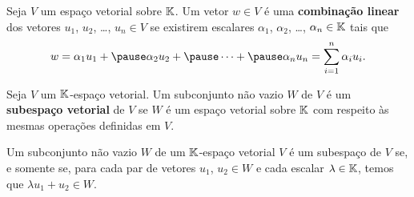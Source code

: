 \documentclass{beamer}
\begin{document}
    \begin{frame}
        \begin{definicao}
	        Seja $V$ um espa\c{c}o vetorial sobre $\mathbb{K}$.\pause 
	        Um vetor $w \in V$ \'e uma \textbf{combina\c{c}\~ao linear} \pause dos vetores $u_1$, \pause $u_2$, \pause \dots, 
	        $u_n \in V$ \pause se existirem escalares $\alpha_1$, \pause $\alpha_2$, \pause \dots, \pause $\alpha_n \in \mathbb{K}$ tais que\pause 
    	    \[
	    	    w = \alpha_1 u_1 + \pause \alpha_2u_2 + \pause \cdots + \pause \alpha_nu_n = \sum_{i = 1}^n \alpha_iu_i.
        	\]
        \end{definicao}
    \end{frame}

    \begin{frame}
        \begin{definicao}
        	Seja $V$ um $\mathbb{K}$-espa\c{c}o vetorial. \pause Um subconjunto n\~ao vazio $W$ \pause de $V$ \'e um \textbf{subespa\c{c}o vetorial} de $V$ \pause se $W$ é um espaço vetorial 
        	sobre $\mathbb{K}$ \pause com respeito às mesmas operações definidas em $V$.\pause 
        \end{definicao}
        
        \begin{teorema}
        	Um subconjunto n\~ao vazio $W$ \pause de um $\mathbb{K}$-espa\c{c}o vetorial $V$ \pause \'e um subespa\c{c}o de $V$ \pause se, e somente se, \pause para cada par de vetores $u_1$, 
        	$u_2 \in W$ \pause e cada escalar $\lambda \in \mathbb{K}$, \pause temos que $\lambda u_1 + u_2 \in W$.
        \end{teorema}
    \end{frame}
\end{document}

